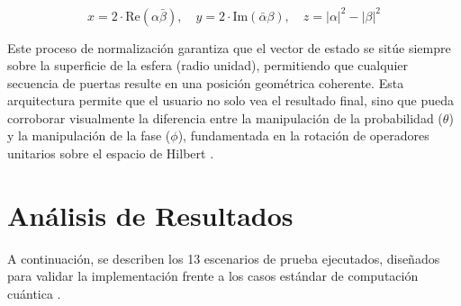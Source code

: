 \documentclass[11pt,a4paper,spanish]{book}
\begin{document}
\begin{equation}
x = 2 \cdot \text{Re}(\alpha\bar{\beta}), \quad y = 2 \cdot \text{Im}(\bar{\alpha}\beta), \quad z = |\alpha|^2 - |\beta|^2
\end{equation}

Este proceso de normalización garantiza que el vector de estado se sitúe siempre sobre la superficie de la esfera (radio unidad), permitiendo que cualquier secuencia de puertas resulte en una posición geométrica coherente. Esta arquitectura permite que el usuario no solo vea el resultado final, sino que pueda corroborar visualmente la diferencia entre la manipulación de la probabilidad ($\theta$) y la manipulación de la fase ($\phi$), fundamentada en la rotación de operadores unitarios sobre el espacio de Hilbert \citep{kaye2007}.

\section{Análisis de Resultados}
A continuación, se describen los 13 escenarios de prueba ejecutados, diseñados para validar la implementación frente a los casos estándar de computación cuántica \citep{nielsen2010}.
\end{document}
